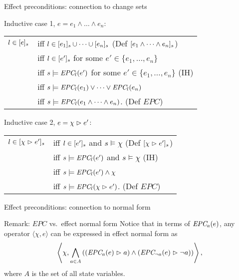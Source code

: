 \documentclass{gkibeamer}
\begin{document}
\begin{frame}{Effect preconditions: connection to change sets}
  \begin{proofend}
    Inductive case 1, $e = e_1 \land \dots \land e_n$: \\
    \begin{tabularx}{\textwidth}{l@{\,}X}
      $l \in \lbrack e\rbrack_{s}$
      & iff
      $l \in \lbrack e_1\rbrack_{s} \cup \dots \cup \lbrack e_n\rbrack_{s}$
      \hfill (\alert{Def $\lbrack e_1 \land \dots \land e_n\rbrack_{s}$}) \\
      & iff
      $l \in \lbrack e'\rbrack_{s}$ for some $e'\in \{e_1, \dots, e_n\}$ \\
      & iff
      $s \models \textit{EPC}_{l}(e')$ for some $e' \in \{e_1, \dots, e_n\}$
      \hfill (\alert{IH}) \\
      & iff
      $s \models \textit{EPC}_{l}(e_1) \lor \dots \lor \textit{EPC}_{l}(e_n)$ \\
      & iff
      $s \models \textit{EPC}_{l}(e_1 \land \dots \land e_n)$.
      \hfill (\alert{Def $\textit{EPC}$})
    \end{tabularx}
    \pause
    \medskip

    Inductive case 2, $e = \chi \vartriangleright e'$: \\
    \begin{tabularx}{\textwidth}{l@{\,}X}
      $l \in \lbrack \chi \vartriangleright e'\rbrack_{s}$
      & iff
      $l \in \lbrack e'\rbrack_{s}$ and $s \models \chi$
      \hfill (\alert{Def $\lbrack \chi \vartriangleright e'\rbrack_{s}$}) \\
      & iff
      $s \models \textit{EPC}_{l}(e')$ and $s \models \chi$
      \hfill (\alert{IH}) \\
      & iff
      $s \models \textit{EPC}_{l}(e') \land \chi$ \\
      & iff
      $s \models \textit{EPC}_{l}(\chi \vartriangleright e')$.
      \hfill (\alert{Def $\textit{EPC}$})
    \end{tabularx}
  \end{proofend}
\end{frame}

\begin{frame}{Effect preconditions: connection to normal form}
  \begin{block}{Remark: $\textit{EPC}$ vs.\ effect normal form}
    Notice that in terms of $\textit{EPC}_{a}(e)$, any operator $\langle
    \chi,e\rangle$ can be expressed in effect normal form as
    \[
      \left\langle \chi, \bigwedge_{a \in A} \left(\left(
      \textit{EPC}_{a}(e) \vartriangleright a \right) \land \left(
      \textit{EPC}_{\neg a}(e) \vartriangleright \neg a\right) \right) \right\rangle,
    \]
    where $A$ is the set of all state variables.
  \end{block}
\end{frame}
\end{document}
